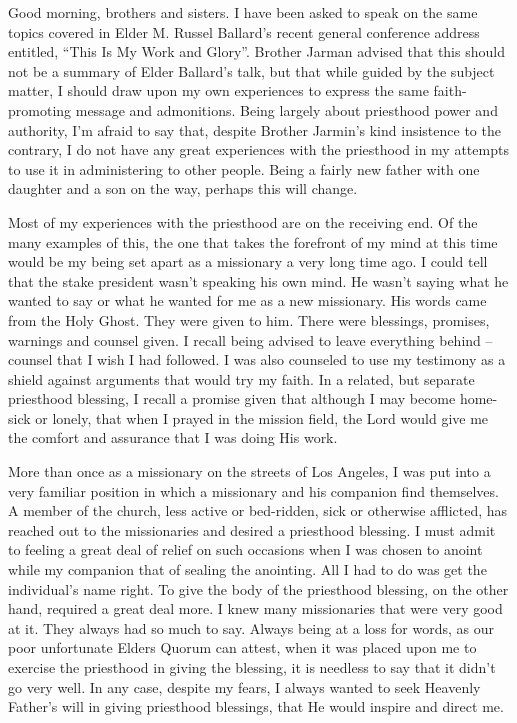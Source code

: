 \documentclass[12pt]{article}
\begin{document}
Good morning, brothers and sisters.  I have been asked to speak on the same topics
covered in Elder M. Russel Ballard's recent general conference address entitled,
``This Is My Work and Glory''.  Brother Jarman advised that this should not be a summary
of Elder Ballard's talk, but that while guided by the subject matter, I should draw
upon my own experiences to express the same faith-promoting message and admonitions.
Being largely about priesthood power and authority, I'm afraid to say that, despite
Brother Jarmin's kind insistence to the contrary, I do not have any great experiences with
the priesthood in my attempts to use it in administering to other people.  Being a fairly
new father with one daughter and a son on the way, perhaps this will change.

Most of my experiences with the priesthood are on the receiving end.  Of the many examples of
this, the one that takes the forefront of my mind at this time would be my being set apart as a
missionary a very long time ago.  I could tell that the stake president wasn't speaking his own
mind.  He wasn't saying what he wanted to say or what he wanted for me as a new missionary.
His words came from the Holy Ghost.  They were given to him.  There were blessings, promises, warnings
and counsel given.  I recall being advised to leave everything behind -- counsel that I
wish I had followed.  I was also counseled to use my testimony as a shield against arguments
that would try my faith.  In a related, but separate priesthood blessing, I recall a promise given that
although I may become home-sick or lonely,
that when I prayed in the mission field, the Lord would give me the comfort and assurance that I was doing His work.

More than once as a missionary on the streets of Los Angeles, I was put into a
very familiar position in which a missionary and his companion find themselves.
A member of the church, less active or bed-ridden, sick or otherwise afflicted,
has reached out to the missionaries and desired a priesthood blessing.  I must admit
to feeling a great deal of relief on such occasions when I was chosen to anoint while
my companion that of sealing the anointing.  All I had to do was get the individual's name right.
To give the body of the priesthood blessing, on the other hand, required a great
deal more.  I knew many missionaries that were very good at it.  They always
had so much to say.  Always being at a loss for words, as our poor unfortunate
Elders Quorum can attest, when it was placed upon me to exercise the priesthood in
giving the blessing, it is needless to say that it didn't go very well.  In any case,
despite my fears, I always wanted to seek Heavenly Father's will in giving priesthood
blessings, that He would inspire and direct me.
\end{document}
